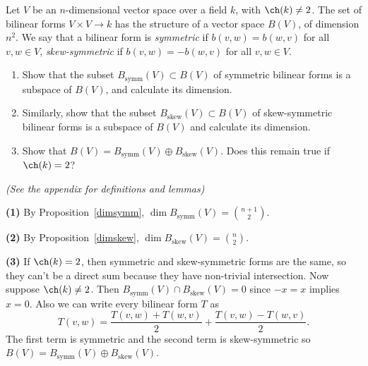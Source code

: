 \begin{problem}
Let $V$ be an $n$-dimensional vector space over a field $k$, with $\ch(k)\neq 2$. The set of bilinear forms $V\times V\to k$ has the structure of a vector space $B(V)$, of dimension $n^2$. We say that a bilinear form is {\em symmetric} if $b(v,w)=b(w,v)$ for all $v,w\in V$, {\em skew-symmetric} if $b(v,w)=-b(w,v)$ for all $v,w\in V$.

\begin{enumerate}
  \item Show that the subset $B_{\mathrm{symm}}(V)\subset B(V)$ of symmetric bilinear forms is a subspace of $B(V)$, and calculate its dimension.
  \item Similarly, show that the subset $B_{\mathrm{skew}}(V)\subset B(V)$ of skew-symmetric bilinear forms is a subspace of $B(V)$ and calculate its dimension.
  \item Show that $B(V)=B_{\mathrm{symm}}(V)\oplus B_{\mathrm{skew}}(V)$. Does this remain true if $\ch(k)=2$?
\end{enumerate}
\end{problem}
\textit{(See the appendix for definitions and lemmas)}

\textbf{(1)} By Proposition~\ref{dimsymm}, $\dim B_{\mathrm{symm}}(V) = \binom{n+1}{2}$.  

\textbf{(2)} By Proposition~\ref{dimskew}, $\dim B_{\mathrm{skew}}(V) = \binom{n}{2}$.

\textbf{(3)} If $\ch(k)=2$, then symmetric and skew-symmetric forms are the same, so they can't be a direct sum because they have non-trivial intersection. Now suppose $\ch(k)\neq 2$. Then $B_{\mathrm{symm}}(V)\cap B_{\mathrm{skew}}(V)=0$ since $-x=x$ implies $x=0$. Also we can write every bilinear form $T$ as
\[
  T(v,w) = \frac{T(v,w)+T(w,v)}{2}+\frac{T(v,w)-T(w,v)}{2}
.\] 
The first term is symmetric and the second term is skew-symmetric so $B(V)=B_{\mathrm{symm}}(V)\oplus B_{\mathrm{skew}}(V)$.        